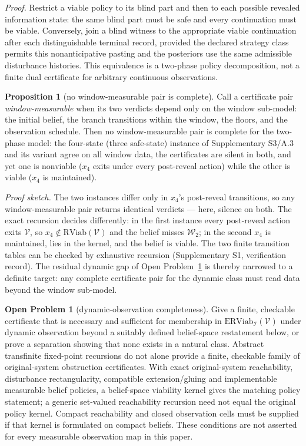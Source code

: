 \documentclass[10pt,twocolumn]{article}
\theoremstyle{definition}
\newtheorem{proposition}{Proposition}
\newtheorem{openproblem}{Open Problem}
\begin{document}
\emph{Proof.} Restrict a viable policy to its blind part and then to each possible revealed information state: the same blind part must be safe and every continuation must be viable. Conversely, join a blind witness to the appropriate viable continuation after each distinguishable terminal record, provided the declared strategy class permits this nonanticipative pasting and the posteriors use the same admissible disturbance histories. This equivalence is a two-phase policy decomposition, not a finite dual certificate for arbitrary continuous observations.

\begin{proposition}[no window-measurable pair is complete]\label{calc-prop:window-nogo}
Call a certificate pair \emph{window-measurable} when its two verdicts depend only on the
window sub-model: the initial belief, the branch transitions within the window, the floors,
and the observation schedule. Then no window-measurable pair is complete for the two-phase
model: the four-state (three safe-state) instance of Supplementary S3/A.3 and its variant agree on all window
data, the certificates are silent in both, and yet one is nonviable (\(x_{4}\) exits under
every post-reveal action) while the other is viable (\(x_{4}\) is maintained).
\end{proposition}

\emph{Proof sketch.} The two instances differ only in \(x_{4}\)'s post-reveal transitions,
so any window-measurable pair returns identical verdicts --- here, silence on both. The
exact recursion decides differently: in the first instance every post-reveal action exits
\(\mathcal{V}\), so \(x_{4} \notin \mathrm{RViab}(\mathcal{V})\) and the belief misses
\(\mathcal{W}_{2}\); in the second \(x_{4}\) is maintained, lies in the kernel, and the
belief is viable. The two finite transition tables can be checked by exhaustive recursion
(Supplementary S1, verification record). The residual dynamic gap of
Open Problem~\ref{calc-op:dynamic} is thereby narrowed to a definite target: any complete
certificate pair for the dynamic class must read data beyond the window sub-model.

\begin{openproblem}[dynamic-observation completeness]\label{calc-op:dynamic}
Give a finite, checkable certificate that is necessary and sufficient for membership in \(\mathrm{ERViab}_{\mathcal{I}}(\mathcal{V})\) under dynamic observation beyond a suitably defined belief-space restatement below, or prove a separation showing that none exists in a natural class. Abstract transfinite fixed-point recursions do not alone provide a finite, checkable family of original-system obstruction certificates. With exact original-system reachability, disturbance rectangularity, compatible extension/gluing and implementable measurable belief policies, a belief-space viability kernel gives the matching policy statement; a generic set-valued reachability recursion need not equal the original policy kernel. Compact reachability and closed observation cells must be supplied if that kernel is formulated on compact beliefs. These conditions are not asserted for every measurable observation map in this paper.
\end{openproblem}
\end{document}
